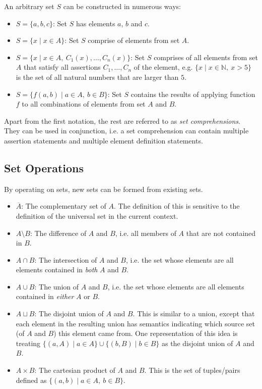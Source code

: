 \documentclass[12pt]{article}
\theoremstyle{definition}
\newcommand{\NN}{\mathbb{N}}
\newcommand{\bras}[1]{\lbrace #1 \rbrace}
\begin{document}
	An arbitrary set $S$ can be constructed in numerous ways:
	\begin{itemize}
		\item $S = \bras{a, b, c}$: Set $S$ has elements $a$, $b$ and $c$.
		\item $S = \bras{x \mid x \in A}$: Set $S$ comprise of elements from set $A$.
		\item $S = \bras{x \mid x \in A,\ C_1(x), \dots, C_n(x)}$: Set $S$ comprises of all elements from set $A$ that satisfy all assertions $C_1, \dots, C_n$ of the element, e.g. $\bras{x \mid x \in \NN,\ x > 5}$ is the set of all natural numbers that are larger than $5$.
		\item $S = \bras{f(a, b) \mid a \in A,\ b \in B}$: Set $S$ contains the results of applying function $f$ to all combinations of elements from set $A$ and $B$.
	\end{itemize}
	
	Apart from the first notation, the rest are referred to as \emph{set comprehensions}. They can be used in conjunction, i.e. a set comprehension can contain multiple assertion statements and multiple element definition statements.
	
	\subsection{Set Operations}
	
	By operating on sets, new sets can be formed from existing sets.
	
	\begin{itemize}
		\item $\overline{A}$: The complementary set of $A$. The definition of this is sensitive to the definition of the universal set in the current context.
		\item $A \setminus B$: The difference of $A$ and $B$, i.e. all members of $A$ that are not contained in $B$.
		\item $A \cap B$: The intersection of $A$ and $B$, i.e. the set whose elements are all elements contained in \emph{both} $A$ and $B$.
		\item $A \cup B$: The union of $A$ and $B$, i.e. the set whose elements are all elements contained in \emph{either} $A$ or $B$.
		\item $A \sqcup B$: The disjoint union of $A$ and $B$. This is similar to a union, except that each element in the resulting union has semantics indicating which source set (of $A$ and $B$) this element came from. One representation of this idea is treating $\bras{(a, A) \mid a \in A} \cup \bras{(b, B) \mid b \in B}$ as the disjoint union of $A$ and $B$.
		\item $A \times B$: The cartesian product of $A$ and $B$. This is the set of tuples/pairs defined as $\bras{(a, b) \mid a \in A,\ b \in B}$.
	\end{itemize}
	
\end{document}
